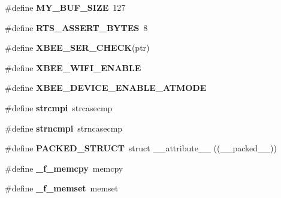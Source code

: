 \begin{DoxyCompactItemize}
\item 
\mbox{\label{group__hal__kl25_ga7889b9b27287ecd3ab94ba0e08eb209e}} 
\#define {\bfseries M\+Y\+\_\+\+B\+U\+F\+\_\+\+S\+I\+ZE}~127
\item 
\mbox{\label{group__hal__kl25_ga7c3a985c27600619d2bc4db511aff598}} 
\#define {\bfseries R\+T\+S\+\_\+\+A\+S\+S\+E\+R\+T\+\_\+\+B\+Y\+T\+ES}~8
\item 
\mbox{\label{group__hal__kl25_ga755b7e850db6200a6f43b741c678ae53}} 
\#define {\bfseries X\+B\+E\+E\+\_\+\+S\+E\+R\+\_\+\+C\+H\+E\+CK}(ptr)
\item 
\mbox{\label{group__hal__kl25_ga7e9a5ad096612667f1abe02fe20e3a25}} 
\#define {\bfseries X\+B\+E\+E\+\_\+\+W\+I\+F\+I\+\_\+\+E\+N\+A\+B\+LE}
\item 
\mbox{\label{group__hal__kl25_ga61c9dcca11a638f39e74b9992aacf82c}} 
\#define {\bfseries X\+B\+E\+E\+\_\+\+D\+E\+V\+I\+C\+E\+\_\+\+E\+N\+A\+B\+L\+E\+\_\+\+A\+T\+M\+O\+DE}
\item 
\mbox{\label{group__hal__kl25_gacf1a32c487efc5306d57219a57d57b60}} 
\#define {\bfseries strcmpi}~strcasecmp
\item 
\mbox{\label{group__hal__kl25_gad3a1fdce8f91caabe3b9aaa93cb69044}} 
\#define {\bfseries strncmpi}~strncasecmp
\item 
\mbox{\label{group__hal__kl25_gafa9179779c676eed926a35c4ab5fe5b5}} 
\#define {\bfseries P\+A\+C\+K\+E\+D\+\_\+\+S\+T\+R\+U\+CT}~struct \+\_\+\+\_\+attribute\+\_\+\+\_\+ ((\+\_\+\+\_\+packed\+\_\+\+\_\+))
\item 
\mbox{\label{group__hal__kl25_ga3ee5b5bde5321e97420753cf13ce9c1b}} 
\#define {\bfseries \+\_\+f\+\_\+memcpy}~memcpy
\item 
\mbox{\label{group__hal__kl25_ga210604a4d70c1421599afca049c8dc55}} 
\#define {\bfseries \+\_\+f\+\_\+memset}~memset
\item 

\end{DoxyCompactItemize}

